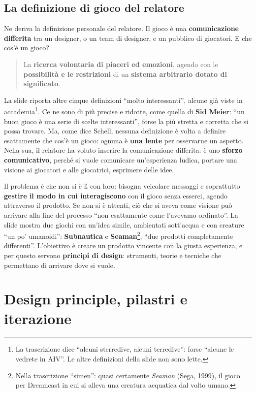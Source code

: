 \subsection{La definizione di gioco del relatore}
\label{subsec:z6-definizione-gioco}

Ne deriva la definizione personale del relatore. Il gioco è una
\textbf{comunicazione differita} tra un designer, o un team di designer, e un
pubblico di giocatori. E che cos'è un gioco?
\begin{quote}
  La \textbf{ricerca volontaria di piaceri ed emozioni}, agendo con le
  \textbf{possibilità e le restrizioni} di un \textbf{sistema arbitrario dotato
  di significato}.
\end{quote}
La slide riporta altre cinque definizioni ``molto interessanti'', alcune già
viste in accademia\footnote{La trascrizione dice ``alcuni sterredive, alcuni
terredive'': forse ``alcune le vedrete in AIV''. Le altre definizioni della
slide non sono lette.}. Ce ne sono di più precise e ridotte, come quella di
\textbf{Sid Meier}: ``un buon gioco è una serie di scelte interessanti'', forse
la più stretta e corretta che si possa trovare. Ma, come dice Schell, nessuna
definizione è volta a definire esattamente che cos'è un gioco: ognuna è
\textbf{una lente} per osservarne un aspetto. Nella sua, il relatore ha voluto
inserire la comunicazione differita: è uno \textbf{sforzo comunicativo}, perché si
vuole comunicare un'esperienza ludica, portare una visione ai giocatori e alle
giocatrici, esprimere delle idee.

Il problema è che non si è lì con loro: bisogna veicolare messaggi e soprattutto
\textbf{gestire il modo in cui interagiscono} con il gioco senza esserci,
agendo attraverso il prodotto. Se non si è attenti, ciò che si aveva come
visione può arrivare alla fine del processo ``non esattamente come l'avevamo
ordinato''. La slide mostra due giochi con un'idea simile, ambientati sott'acqua
e con creature ``un po' umanoidi'': \textbf{Subnautica} e
\textbf{Seaman}\footnote{Nella trascrizione ``simen'': quasi certamente
\emph{Seaman} (Sega, 1999), il gioco per Dreamcast in cui si alleva una creatura
acquatica dal volto umano.}, ``due prodotti completamente differenti''.
L'obiettivo è creare un prodotto vincente con la giusta esperienza, e per questo
servono \textbf{principi di design}: strumenti, teorie e tecniche che permettano
di arrivare dove si vuole.

\section{Design principle, pilastri e iterazione}
\label{sec:z6-pilastri}

